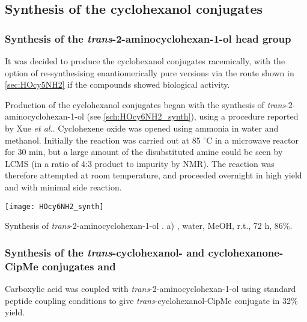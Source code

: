 \subsection{Synthesis of the cyclohexanol conjugates}

\subsubsection{Synthesis of the \textit{trans}-2-aminocyclohexan-1-ol head group }

It was decided to produce the cyclohexanol conjugates racemically, with the option of re-synthesising enantiomerically pure versions via the route shown in \ref{sec:HOcy5NH2} if the compounds showed biological activity.

Production of the cyclohexanol conjugates began with the synthesis of \textit{trans}-2-aminocyclohexan-1-ol  (see \ref{sch:HOcy6NH2_synth}), using a procedure reported by Xue \textit{et al.}\cite{Xue2006}.
Cyclohexene oxide  was opened using ammonia in water and methanol. Initially the reaction was carried out at 85 $^{\circ}$C in a microwave reactor for 30 min, but a large amount of the disubstituted amine could be seen by LCMS (in a ratio of 4:3 product to impurity by NMR). The reaction was therefore attempted at room temperature, and proceeded overnight in high yield and with minimal side reaction.

\begin{scheme}[H]
	\begin{center}
		\texttt{[image: HOcy6NH2\_synth]}
		\caption{Synthesis of \textit{trans}-2-aminocyclohexan-1-ol .
		a) , water, MeOH, r.t., 72 h, 86\%.
		\label{sch:HOcy6NH2_synth}}
	\end{center}
\end{scheme}

\subsubsection{Synthesis of the \textit{trans}-cyclohexanol- and cyclohexanone-CipMe conjugates  and  \label{sec:Ocy6}}

Carboxylic acid  was coupled with \textit{trans}-2-aminocyclohexan-1-ol  using standard peptide coupling conditions to give \textit{trans}-cyclohexanol-CipMe conjugate  in 32\% yield.

